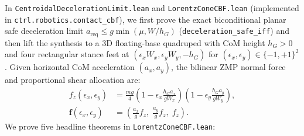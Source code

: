 \documentclass[10pt,twocolumn]{article}
\theoremstyle{definition}
\begin{document}
In \texttt{CentroidalDecelerationLimit.lean} and \texttt{LorentzConeCBF.lean} (implemented in \texttt{ctrl.robotics.contact\_cbf}), we first prove the exact biconditional planar safe deceleration limit $a_{\text{req}} \le g\min(\mu, W/h_G)$ (\texttt{deceleration\_safe\_iff}) and then lift the synthesis to a 3D floating-base quadruped with CoM height $h_G > 0$ and four rectangular stance feet at $(\epsilon_x W_x, \epsilon_y W_y, -h_G)$ for $(\epsilon_x, \epsilon_y) \in \{-1, +1\}^2$. Given horizontal CoM acceleration $(a_x, a_y)$, the bilinear ZMP normal force and proportional shear allocation are:
\begin{align}
  f_z(\epsilon_x, \epsilon_y) &= \frac{mg}{4}\!\left(1 - \epsilon_x\frac{h_G a_x}{g W_x}\right)\!\left(1 - \epsilon_y\frac{h_G a_y}{g W_y}\right), \\
  \mathbf{f}(\epsilon_x, \epsilon_y) &= \left(\frac{a_x}{g}f_z,\; \frac{a_y}{g}f_z,\; f_z\right).
\end{align}
We prove five headline theorems in \texttt{LorentzConeCBF.lean}:
\end{document}
